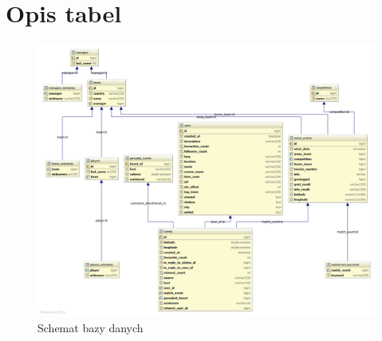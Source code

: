 \chapter{Opis tabel}
\label{chap:opistabel}

\begin{figure}[ht!]
\centering
\includegraphics[width=160mm]{img/db-schema-intellij.png}
\caption{Schemat bazy danych}
\label{image:schemat-bazy-dodatek}
\end{figure}

